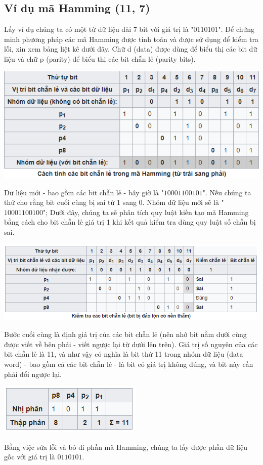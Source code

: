 \documentclass[14pt]{extreport}
\begin{document}
\subsection{Ví dụ mã Hamming (11, 7)}
Lấy ví dụ chúng ta có một từ dữ liệu dài 7 bit với giá trị là "$0110101$". Để chứng minh phương pháp các mã Hamming được tính toán và được sử dụng để kiểm tra lỗi, xin xem bảng liệt kê dưới đây. Chữ d (data) được dùng để biểu thị các bit dữ liệu và chữ p (parity) để biểu thị các bit chẵn lẻ (parity bits).
\begin{center}
\includegraphics[scale=0.8]{bang1.png}
\end{center}
Dữ liệu mới - bao gồm các bit chẵn lẻ - bây giờ là "$10001100101$". Nếu chúng ta thử cho rằng bit cuối cùng bị sai từ 1 sang 0. Nhóm dữ liệu mới sẽ là "$10001100100$"; Dưới đây, chúng ta sẽ phân tích quy luật kiến tạo mã Hamming bằng cách cho bit chẵn lẻ giá trị 1 khi kết quả kiểm tra dùng quy luật số chẵn bị sai.
\begin{center}
\includegraphics[scale=0.8]{bang2.png}
\end{center}
Bước cuối cùng là định giá trị của các bit chẵn lẻ (nên nhớ bit nằm dưới cùng được viết về bên phải - viết ngược lại từ dưới lên trên). Giá trị số nguyên của các bit chẵn lẻ là 11, và như vậy có nghĩa là bit thứ 11 trong nhóm dữ liệu (data word) - bao gồm cả các bit chẵn lẻ - là bit có giá trị không đúng, và bit này cần phải đổi ngược lại.
\begin{center}
\includegraphics[scale=0.8]{bang3.png}
\end{center}
Bằng việc sửa lỗi và bỏ đi phần mã Hamming, chúng ta lấy được phần dữ liệu gốc với giá trị là $0110101$.\\
\end{document}
